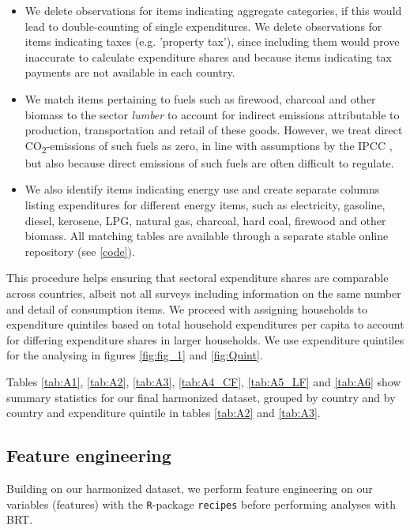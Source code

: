 \documentclass[12pt, a4paper]{article}
\begin{document}
\begin{refsection}
\begin{itemize}
    \item We delete observations for items indicating aggregate categories, if this would lead to double-counting of single expenditures. We delete observations for items indicating taxes (e.g. 'property tax'), since including them would prove inaccurate to calculate expenditure shares and because items indicating tax payments are not available in each country.
    \item We match items pertaining to fuels such as firewood, charcoal and other biomass to the sector \textit{lumber} to account for indirect emissions attributable to production, transportation and retail of these goods. However, we treat direct CO\textsubscript{2}-emissions of such fuels as zero, in line with assumptions by the IPCC \autocite{Grad.2023}, but also because direct emissions of such fuels are often difficult to regulate.
    \item We also identify items indicating energy use and create separate columns listing expenditures for different energy items, such as electricity, gasoline, diesel, kerosene, LPG, natural gas, charcoal, hard coal, firewood and other biomass. All matching tables are available through a separate stable online repository (see \ref{code}).
\end{itemize}

This procedure helps ensuring that sectoral expenditure shares are comparable across countries, albeit not all surveys including information on the same number and detail of consumption items. We proceed with assigning households to expenditure quintiles based on total household expenditures per capita to account for differing expenditure shares in larger households. We use expenditure quintiles for the analysing in figures \ref{fig:fig_1} and \ref{fig:Quint}.

Tables \ref{tab:A1}, \ref{tab:A2}, \ref{tab:A3}, \ref{tab:A4_CF}, \ref{tab:A5_LF} and \ref{tab:A6} show summary statistics for our final harmonized dataset, grouped by country and by country and expenditure quintile in tables \ref{tab:A2} and \ref{tab:A3}. 


\subsection{Feature engineering} \label{sec:featureengineering}

Building on our harmonized dataset, we perform feature engineering on our variables (features) with the \texttt{R}-package \texttt{recipes} before performing analyses with BRT.


\end{refsection}
\end{document}
